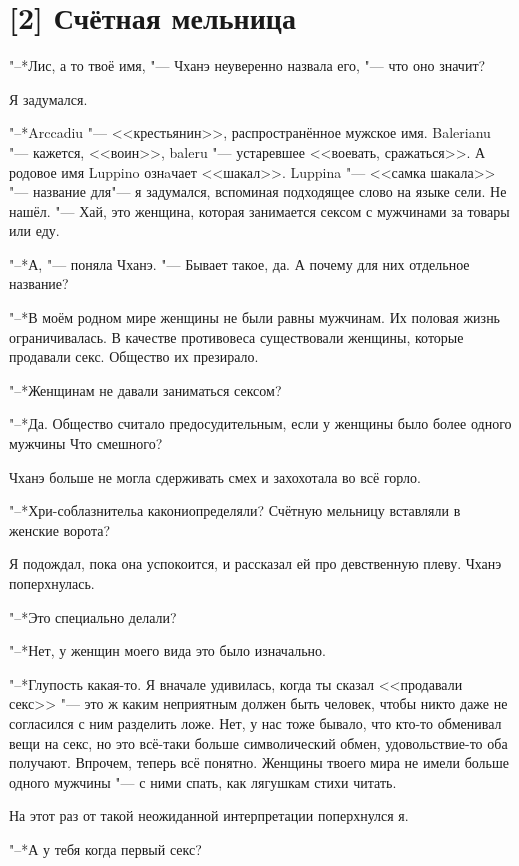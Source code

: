 \section{[2] Счётная мельница}

"--*Лис, а то твоё имя, "--- Чханэ неуверенно назвала его, "--- что оно значит?

Я задумался.

"--*Arccadiu "--- <<крестьянин>>, распространённое мужское имя.
Balerianu "--- кажется, <<воин>>, baleru "--- устаревшее <<воевать, сражаться>>.
А родовое имя Luppino ознaчает <<шакал>>.
Luppina "--- <<самка шакала>> "--- название для\ldotst "--- я задумался, вспоминая подходящее слово на языке сели.
Не нашёл.
"--- Хай, это женщина, которая занимается сексом с мужчинами за товары или еду.

"--*А, "--- поняла Чханэ.
"--- Бывает такое, да.
А почему для них отдельное название?

"--*В моём родном мире женщины не были равны мужчинам.
Их половая жизнь ограничивалась.
В качестве противовеса существовали женщины, которые продавали секс.
Общество их презирало.

"--*Женщинам не давали заниматься сексом?

"--*Да.
Общество считало предосудительным, если у женщины было более одного мужчины\ldotst
Что смешного?

Чханэ больше не могла сдерживать смех и захохотала во всё горло.

"--*Хри-соблазнитель\ldotst а как\ldotst они\ldotst определяли?
Счётную мельницу вставляли в женские ворота?

Я подождал, пока она успокоится, и рассказал ей про девственную плеву.
Чханэ поперхнулась.

"--*Это специально делали?

"--*Нет, у женщин моего вида это было изначально.

"--*Глупость какая-то.
Я вначале удивилась, когда ты сказал <<продавали секс>> "--- это ж каким неприятным должен быть человек, чтобы никто даже не согласился с ним разделить ложе.
Нет, у нас тоже бывало, что кто-то обменивал вещи на секс, но это всё-таки больше символический обмен, удовольствие-то оба получают.
Впрочем, теперь всё понятно.
Женщины твоего мира не имели больше одного мужчины "--- с ними спать, как лягушкам стихи читать.

На этот раз от такой неожиданной интерпретации поперхнулся я.

"--*А у тебя когда первый секс?

